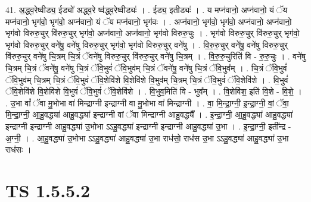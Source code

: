 \documentclass[17pt]{extarticle}
\begin{document}
41. अ॒द्ध्व॒रेष्वीड्य॒ ईड्यो॑ अद्ध्व॒रे ष्व॑द्ध्व॒रेष्वीड्यः॑ । . ईड्य॒ इतीड्यः॑ । . य मप्न॑वानो॒ अप्न॑वानो॒ यं ॅय मप्न॑वानो॒ भृग॑वो॒ भृग॑वो॒ अप्न॑वानो॒ यं ॅय मप्न॑वानो॒ भृग॑वः । . अप्न॑वानो॒ भृग॑वो॒ भृग॑वो॒ अप्न॑वानो॒ अप्न॑वानो॒ भृग॑वो विरुरु॒चुर् वि॑रुरु॒चुर् भृग॑वो॒ अप्न॑वानो॒ अप्न॑वानो॒ भृग॑वो विरुरु॒चुः । . भृग॑वो विरुरु॒चुर् वि॑रुरु॒चुर् भृग॑वो॒ भृग॑वो विरुरु॒चुर् वने॑षु॒ वने॑षु विरुरु॒चुर् भृग॑वो॒ भृग॑वो विरुरु॒चुर् वने॑षु । . वि॒रु॒रु॒चुर् वने॑षु॒ वने॑षु विरुरु॒चुर् वि॑रुरु॒चुर् वने॑षु चि॒त्रम् चि॒त्रं ॅवने॑षु विरुरु॒चुर् वि॑रुरु॒चुर् वने॑षु चि॒त्रम् । . वि॒रु॒रु॒चुरिति॑ वि - रु॒रु॒चुः । . वने॑षु चि॒त्रम् चि॒त्रं ॅवने॑षु॒ वने॑षु चि॒त्रं ॅवि॒भुवं॑ ॅवि॒भुव॑म् चि॒त्रं ॅवने॑षु॒ वने॑षु चि॒त्रं ॅवि॒भुव᳚म् । . चि॒त्रं ॅवि॒भुवं॑ ॅवि॒भुव॑म् चि॒त्रम् चि॒त्रं ॅवि॒भुवं॑ ॅवि॒शेवि॑शे वि॒शेवि॑शे वि॒भुव॑म् चि॒त्रम् चि॒त्रं ॅवि॒भुवं॑ ॅवि॒शेवि॑शे । . वि॒भुवं॑ ॅवि॒शेवि॑शे वि॒शेवि॑शे वि॒भुवं॑ ॅवि॒भुवं॑ ॅवि॒शेवि॑शे । . वि॒भुव॒मिति॑ वि - भुव᳚म् । . वि॒शेवि॑श॒ इति॑ वि॒शे - वि॒शे॒ । . उ॒भा वां᳚ ॅवा मु॒भोभा वा॑ मिन्द्राग्नी इन्द्राग्नी वा मु॒भोभा वा॑ मिन्द्राग्नी । . वा॒ मि॒न्द्रा॒ग्नी॒ इ॒न्द्रा॒ग्नी॒ वां॒ ॅवा॒ मि॒न्द्रा॒ग्नी॒ आ॒हु॒वद्ध्या॑ आहु॒वद्ध्या॑ इन्द्राग्नी वां ॅवा मिन्द्राग्नी आहु॒वद्ध्यै᳚ । . इ॒न्द्रा॒ग्नी॒ आ॒हु॒वद्ध्या॑ आहु॒वद्ध्या॑ इन्द्राग्नी इन्द्राग्नी आहु॒वद्ध्या॑ उ॒भोभा ऽऽहु॒वद्ध्या॑ इन्द्राग्नी इन्द्राग्नी आहु॒वद्ध्या॑ उ॒भा । . इ॒न्द्रा॒ग्नी॒ इती᳚न्द्र - अ॒ग्नी॒ । . आ॒हु॒वद्ध्या॑ उ॒भोभा ऽऽहु॒वद्ध्या॑ आहु॒वद्ध्या॑ उ॒भा राध॑सो॒ राध॑स उ॒भा ऽऽहु॒वद्ध्या॑ आहु॒वद्ध्या॑ उ॒भा राध॑सः । \newline
\pagebreak
{}

\section{ TS 1.5.5.2 }
\end{document}

